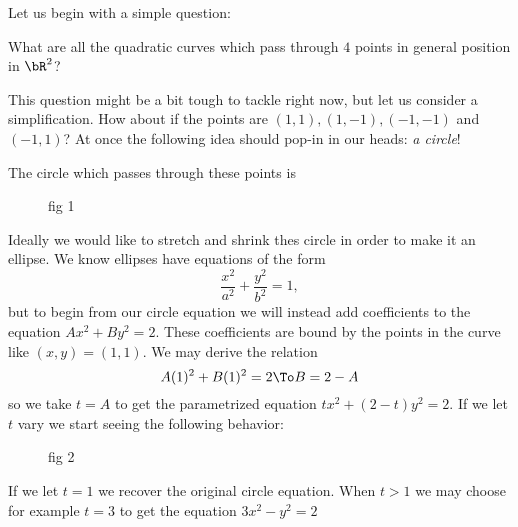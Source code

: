 \documentclass[12pt]{memoir}
\begin{document}
Let us begin with a simple question:
\begin{significant}
What are all the quadratic curves which pass through $4$ points in general position in $\bR^2$?
\end{significant}
This question might be a bit tough to tackle right now, but let us consider a simplification. How about if the points are $(1,1),(1,-1),(-1,-1)$ and $(-1,1)$? At once the following idea should pop-in in our heads: \emph{a circle}!\par 
The circle which passes through these points is 
\begin{figure}
    fig 1
\end{figure}
Ideally we would like to stretch and shrink thes circle in order to make it an ellipse. We know ellipses have equations of the form $$\frac{x^2}{a^2}+\frac{y^2}{b^2}=1,$$ 
but to begin from our circle equation we will instead add coefficients to the equation $Ax^2+By^2=2$. These coefficients are bound by the points in the curve like $(x,y)=(1,1)$. We may derive the relation 
$$A(1)^2+B(1)^2=2\To B=2-A$$
so we take $t=A$ to get the parametrized equation $tx^2+(2-t)y^2=2$. If we let $t$ vary we start seeing the following behavior:
\begin{figure}
    fig 2
\end{figure}
If we let $t=1$ we recover the original circle equation. When $t>1$ we may choose for example $t=3$ to get the equation $3x^2-y^2=2$
\end{document}
